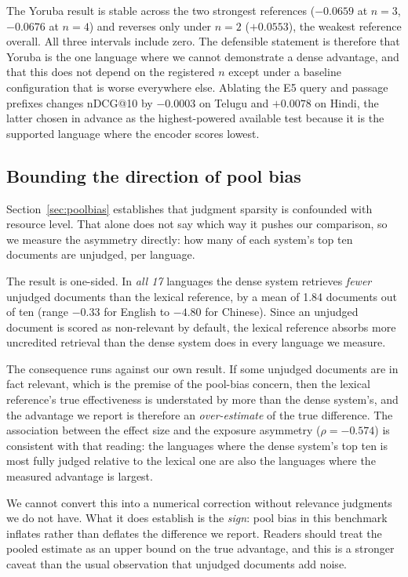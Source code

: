\documentclass{ijimai_article}
\begin{document}
The Yoruba result is stable across the two strongest references ($-0.0659$ at $n{=}3$,
$-0.0676$ at $n{=}4$) and reverses only under $n{=}2$ ($+0.0553$), the weakest reference
overall. All three intervals include zero. The defensible statement is therefore that
Yoruba is the one language where we cannot demonstrate a dense advantage, and that this
does not depend on the registered $n$ except under a baseline configuration that is
worse everywhere else.
Ablating the E5 query and passage prefixes changes nDCG@10 by $-0.0003$ on Telugu
and $+0.0078$ on Hindi, the latter chosen in advance as the highest-powered
available test because it is the supported language where the encoder scores
lowest.

\subsection{Bounding the direction of pool bias}
\label{sec:poolbound}
Section~\ref{sec:poolbias} establishes that judgment sparsity is confounded with
resource level. That alone does not say which way it pushes our comparison, so we
measure the asymmetry directly: how many of each system's top ten documents are
unjudged, per language.

The result is one-sided. In \emph{all 17} languages the dense system retrieves
\emph{fewer} unjudged documents than the lexical reference, by a mean of 1.84
documents out of ten (range $-0.33$ for English to $-4.80$ for Chinese). Since an
unjudged document is scored as non-relevant by default, the lexical reference absorbs
more uncredited retrieval than the dense system does in every language we measure.

The consequence runs against our own result. If some unjudged documents are in fact
relevant, which is the premise of the pool-bias concern, then the lexical
reference's true effectiveness is understated by more than the dense system's, and
the advantage we report is therefore an \emph{over-estimate} of the true difference.
The association between the effect size and the exposure asymmetry
($\rho = -0.574$) is consistent with that reading: the languages where the dense
system's top ten is most fully judged relative to the lexical one are also the
languages where the measured advantage is largest.

We cannot convert this into a numerical correction without relevance judgments we do
not have. What it does establish is the \emph{sign}: pool bias in this benchmark
inflates rather than deflates the difference we report. Readers should treat the
pooled estimate as an upper bound on the true advantage, and this is a stronger
caveat than the usual observation that unjudged documents add noise.
\end{document}
